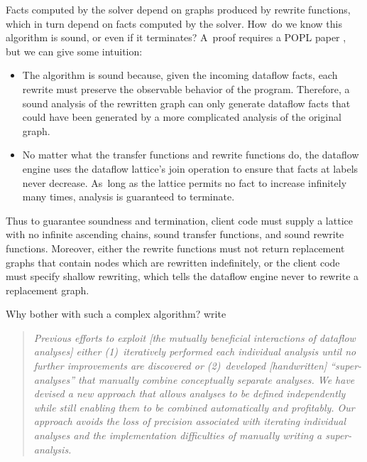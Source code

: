 \documentclass[blockstyle,preprint,natbib,nocopyrightspace]{sigplanconf}
\let\cite\citep
\begin{document}
Facts computed by the solver depend on graphs produced by rewrite
functions, which in turn depend on facts computed by the solver.
How~do we know this algorithm is sound, or even if it terminates?
A~proof requires a POPL paper
\cite{lerner-grove-chambers:2002}, but we can give some
intuition:
\begin{itemize} 
\item
The algorithm is sound because, given the incoming dataflow facts,
each rewrite must preserve the observable behavior of the program.
Therefore, a sound analysis of the rewritten graph
can only generate dataflow facts that could have been
generated by a more complicated analysis of the original graph.
\item
No matter what the transfer functions and rewrite functions do,
the dataflow engine uses the dataflow lattice's join operation to ensure that
facts at labels never decrease. 
As~long as the lattice permits no fact to increase infinitely many
times, analysis is guaranteed to terminate.
\end{itemize}
Thus to guarantee soundness and termination, client code must supply a
lattice with no infinite ascending chains, sound transfer functions,
and sound rewrite functions.
Moreover, either the rewrite functions must not return replacement
graphs that contain nodes which are rewritten indefinitely,
or the client code must specify shallow rewriting, which tells the
dataflow engine never to rewrite a replacement graph.

Why bother with such a complex algorithm?
\citet{lerner-grove-chambers:2002} write
\begin{quote}
\emph{Previous efforts to exploit [the mutually beneficial
interactions of dataflow analyses] either (1)~iteratively performed
each individual analysis until no further improvements are discovered
or (2)~developed [handwritten] ``super-analyses'' that manually
combine conceptually separate analyses. We have devised a new approach
that allows analyses to be defined independently while still enabling
them to be combined automatically and profitably. Our approach avoids
the loss of precision associated with iterating individual analyses
and the implementation difficulties of manually writing a
super-analysis.}
\end{quote}
\end{document}

